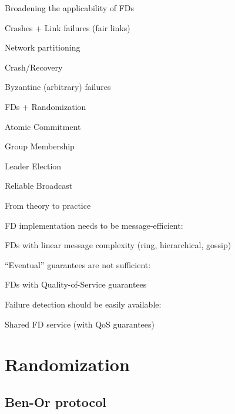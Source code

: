 \begin{frame}{Broadening the applicability of  FDs}
	
\BI
\item Crashes + Link failures (fair links)
\item Network partitioning
\item Crash/Recovery
\item Byzantine (arbitrary) failures
\item FDs + Randomization
\EI

\bigskip
{}
\BI
\item Atomic Commitment
\item Group Membership
\item Leader Election
\item \alert{Reliable Broadcast}
\EI

\end{frame}

\begin{frame}[shrink]{From theory to practice}
	
\BIL
\item \alert{FD implementation needs to be message-efficient}:
	\BI
	\item FDs with linear message complexity (ring, hierarchical, gossip) 
	\EI
\item \alert{“Eventual” guarantees are not sufficient}:
	\BI
	\item FDs with Quality-of-Service guarantees
	\EI
\item \alert{Failure detection should be easily available}:
	\BI
	\item Shared FD service (with QoS guarantees)
	\EI
\EIL

\bigskip
\begin{Bib}
\BI
\item {}
\item {}
\EI
\end{Bib}


\end{frame}

\section{Randomization}

\subsection{Ben-Or protocol}

